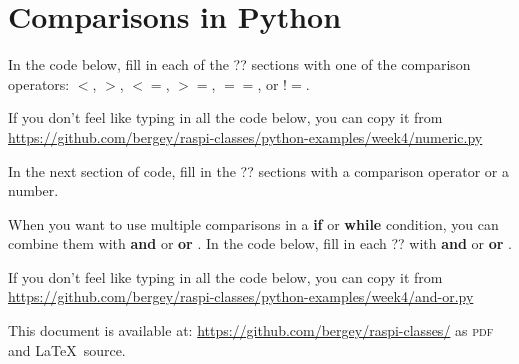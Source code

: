 \documentclass{article}
\newcommand\And{\textbf{and} }
\newcommand\Or{\textbf{or} }
\begin{document}
\section{Comparisons in Python}

In the code below, fill in each of the ?? sections with one of the comparison operators:   $<$, $>$, $<=$, $>=$, $==$, or $!=$.

If you don't feel like typing in all the code below, you can copy it from \url{https://github.com/bergey/raspi-classes/python-examples/week4/numeric.py}



In the next section of code, fill in the ?? sections with a comparison operator or a number.



When you want to use multiple comparisons in a \textbf{if} or \textbf{while} condition, you can combine them with \And or \Or.  In the code below, fill in each ?? with \And or \Or.

If you don't feel like typing in all the code below, you can copy it from \url{https://github.com/bergey/raspi-classes/python-examples/week4/and-or.py}



This document is available at: \url{https://github.com/bergey/raspi-classes/} as \textsc{pdf} and \LaTeX\ source.  
\end{document}
